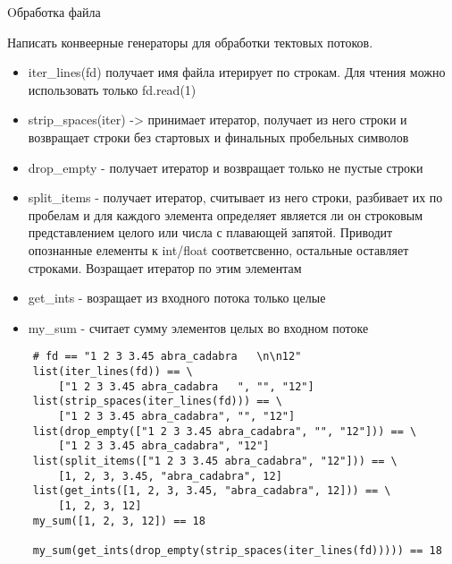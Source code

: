 \documentclass{article}
\begin{document}
\begin{center} Oбработка файла \end{center}
Написать конвеерные генераторы для обработки тектовых потоков.
\begin{itemize}
    \item iter\_lines(fd) получает имя файла итерирует по строкам. 
           Для чтения можно использовать только fd.read(1)
    \item strip\_spaces(iter) -> принимает итератор, получает из него 
          строки и возвращает строки без стартовых и финальных пробельных символов
    \item drop\_empty - получает итератор и возвращает только не пустые строки
    \item split\_items - получает итератор, считывает из него строки, 
          разбивает их по пробелам и для каждого элемента определяет является ли он
          строковым представлением целого или числа с плавающей запятой.
          Приводит опознанные елементы к int/float соответсвенно, остальные оставляет
          строками. Возращает итератор по этим элементам
    \item get\_ints - возращает из входного потока только целые
    \item my\_sum - считает сумму элементов целых во входном потоке
\end{itemize}

\begin{lstlisting}
    # fd == "1 2 3 3.45 abra_cadabra   \n\n12"
    list(iter_lines(fd)) == \
        ["1 2 3 3.45 abra_cadabra   ", "", "12"]
    list(strip_spaces(iter_lines(fd))) == \
        ["1 2 3 3.45 abra_cadabra", "", "12"]
    list(drop_empty(["1 2 3 3.45 abra_cadabra", "", "12"])) == \
        ["1 2 3 3.45 abra_cadabra", "12"]
    list(split_items(["1 2 3 3.45 abra_cadabra", "12"])) == \
        [1, 2, 3, 3.45, "abra_cadabra", 12]
    list(get_ints([1, 2, 3, 3.45, "abra_cadabra", 12])) == \
        [1, 2, 3, 12]
    my_sum([1, 2, 3, 12]) == 18

    my_sum(get_ints(drop_empty(strip_spaces(iter_lines(fd))))) == 18
\end{lstlisting}

\newpage
\end{document}
